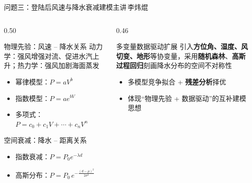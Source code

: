 \documentclass{beamer}
\newcommand{\speaker}[1]{\hfill{\normalfont\scriptsize\kaishu\color{uestc!30!white}主讲\,#1}}
\begin{document}
\begin{frame}{问题三：登陆后风速与降水衰减建模\speaker{李炜焜}}
    \begin{columns}
        \begin{column}{0.50\textwidth}
            \begin{block}{物理先验：风速 -- 降水关系}\small
                动力学：强风增强对流、促进水汽上升；热力学：强风加剧海面蒸发
                \begin{itemize}
                    \item 幂律模型：$P = aV^b$
                    \item 指数模型：$P = ae^{bV}$
                    \item 多项式：$P = c_0 + c_1V + \cdots + c_nV^n$
                \end{itemize}
            \end{block}
            \begin{block}{空间衰减：降水 -- 距离关系}\small
                \begin{itemize}
                    \item 指数衰减：$P = P_0e^{-\lambda d}$
                    \item 高斯分布：$P = P_0\,e^{-\frac{(d-\mu)^2}{2\sigma^2}}$
                \end{itemize}
            \end{block}
        \end{column}
        \begin{column}{0.46\textwidth}
            \begin{block}{多变量数据驱动扩展}\small
                引入\textbf{方位角、湿度、风切变、地形}等协变量，采用\textbf{随机森林}、\textbf{高斯过程回归}刻画降水分布的空间不对称性
            \end{block}
            \begin{itemize}\small
                \item 多模型竞争拟合 + \textbf{残差分析}择优
                \item 体现“物理先验 + 数据驱动”的互补建模思想
            \end{itemize}
        \end{column}
    \end{columns}
\end{frame}
\end{document}
